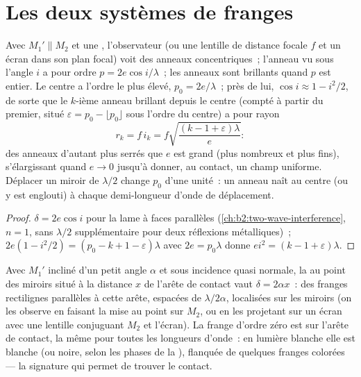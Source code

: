 \section{Les deux systèmes de franges}

\begin{proposition}\label{prop:b2:michelson:rings}
Avec $M_1' \parallel M_2$ et une , l'observateur (ou une lentille
de distance focale $f$ et un écran dans son plan focal) voit des anneaux
concentriques~; l'anneau vu sous l'angle $i$ a pour ordre $p = 2e\cos i/\lambda$~; les anneaux
sont brillants quand $p$ est entier. Le centre a l'ordre le plus élevé, $p_0 =
2e/\lambda$~; près de lui, $\cos i \approx 1 - i^2/2$, de sorte que le $k$-ième anneau brillant depuis le
centre (compté à partir du premier, situé $\varepsilon = p_0 - \lfloor p_0\rfloor$
sous l'ordre du centre) a pour rayon
\[
r_k = f\,i_k = f\sqrt{\frac{(k - 1 + \varepsilon)\lambda}e} :
\]
des anneaux d'autant plus serrés que $e$ est grand (plus nombreux et plus fins), s'élargissant quand $e \to 0$
jusqu'à donner, au contact, un champ uniforme. Déplacer un miroir de $\lambda/2$ change
$p_0$ d'une unité~: un anneau naît au centre (ou y est englouti) à chaque
demi-longueur d'onde de déplacement.
\end{proposition}

\begin{proof}
$\delta = 2e\cos i$ pour la lame à faces parallèles (\cref{ch:b2:two-wave-interference},
$n = 1$, sans $\lambda/2$ supplémentaire pour deux réflexions métalliques)~; $2e(1 - i^2/2) =
(p_0 - k + 1 - \varepsilon)\lambda$ avec $2e = p_0\lambda$ donne $ei^2 = (k - 1 + \varepsilon)\lambda$.
\end{proof}

\begin{proposition}\label{prop:b2:michelson:wedge}
Avec $M_1'$ incliné d'un petit angle $\alpha$ et sous incidence quasi normale, la
 au point des miroirs situé à la distance $x$ de
l'arête de contact vaut $\delta = 2\alpha x$~: des franges rectilignes parallèles à cette arête,
espacées de $\lambda/2\alpha$, localisées sur les miroirs (on les observe en faisant la mise au point
sur $M_2$, ou en les projetant sur un écran avec une lentille conjuguant $M_2$ et
l'écran). La frange d'ordre zéro est sur l'arête de contact, la même pour
toutes les longueurs d'onde~: en lumière blanche elle est blanche (ou noire, selon
les phases de la ), flanquée de quelques franges colorées --- la
signature qui permet de trouver le contact.
\end{proposition}

